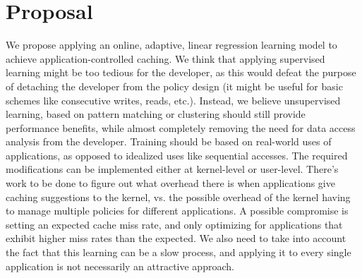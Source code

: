 \section{Proposal}

We propose applying an online, adaptive, linear regression learning model to achieve application-controlled
caching.  We think that applying supervised learning might be too tedious for
the developer, as this would defeat the purpose of detaching the developer from
the policy design (it might be useful for basic schemes like consecutive
writes, reads, etc.).  Instead, we believe unsupervised learning, based on
pattern matching or clustering should still provide performance benefits, while
almost completely removing the need for data access analysis from the
developer.  Training should be based on real-world uses of applications, as
opposed to idealized uses like sequential accesses.  The required modifications
can be implemented either at kernel-level or user-level.  There's work to be
done to figure out what overhead there is when applications give caching
suggestions to the kernel, vs.  the possible overhead of the kernel having to
manage multiple policies for different applications.  A possible compromise is
setting an expected cache miss rate, and only optimizing for applications that
exhibit higher miss rates than the expected.  We also need to take into account
the fact that this learning can be a slow process, and applying it to every
single application is not necessarily an attractive approach.
